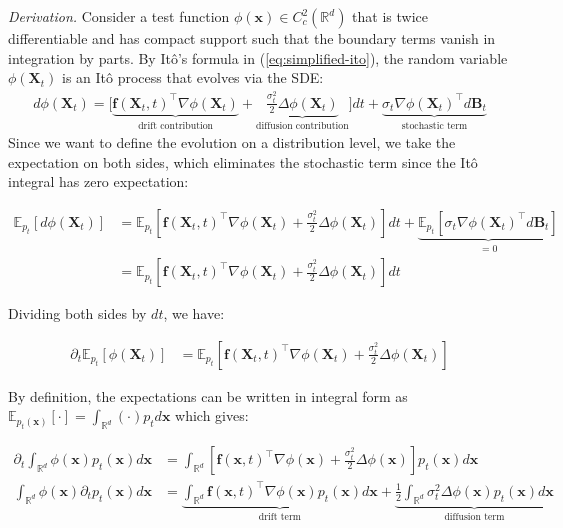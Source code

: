 \documentclass{article}
\begin{document}
\textit{Derivation.} Consider a test function $\phi(\boldsymbol{x})\in C_c^2(\mathbb{R}^d)$ that is twice differentiable and has compact support such that the boundary terms vanish in integration by parts. By Itô's formula in (\ref{eq:simplified-ito}), the random variable $\phi(\boldsymbol{X}_t)$ is an Itô process that evolves via the SDE:
\begin{align}
    d\phi(\boldsymbol{X}_t)=\bigg[\underbrace{\boldsymbol{f}(\boldsymbol{X}_t,t)^\top \nabla \phi(\boldsymbol{X}_t)}_{\text{drift contribution}}+\underbrace{\frac{\sigma_t^2}{2}\Delta \phi(\boldsymbol{X}_t)}_{\text{diffusion contribution}}\bigg]dt+\underbrace{\sigma_t\nabla \phi(\boldsymbol{X}_t)^\top d\boldsymbol{B}_t}_{\text{stochastic term}}
\end{align}
Since we want to define the evolution on a distribution level, we take the expectation on both sides, which eliminates the stochastic term since the Itô integral has zero expectation:
\begin{small}
\begin{align}
    \mathbb{E}_{p_t}\left[d\phi(\boldsymbol{X}_t)\right]&=\mathbb{E}_{p_t}\left[\boldsymbol{f}(\boldsymbol{X}_t,t)^\top \nabla \phi(\boldsymbol{X}_t)+\frac{\sigma_t^2}{2}\Delta \phi(\boldsymbol{X}_t)\right]dt+\underbrace{\mathbb{E}_{p_t}\left[\sigma_t\nabla \phi(\boldsymbol{X}_t)^\top d\boldsymbol{B}_t\right]}_{=0}\nonumber\\
    &=\mathbb{E}_{p_t}\left[\boldsymbol{f}(\boldsymbol{X}_t,t)^\top \nabla \phi(\boldsymbol{X}_t)+\frac{\sigma_t^2}{2}\Delta \phi(\boldsymbol{X}_t)\right]dt
\end{align}
\end{small}
Dividing both sides by $dt$, we have:
\begin{small}
\begin{align}
    \partial_t\mathbb{E}_{p_t}\left[\phi(\boldsymbol{X}_t)\right]&=\mathbb{E}_{p_t}\left[\boldsymbol{f}(\boldsymbol{X}_t,t)^\top\nabla \phi(\boldsymbol{X}_t)+\frac{\sigma_t^2}{2}\Delta \phi(\boldsymbol{X}_t)\right]
\end{align}
\end{small}
By definition, the expectations can be written in integral form as $\mathbb{E}_{p_t(\boldsymbol{x})}[\cdot]=\int_{\mathbb{R}^d}(\cdot)p_td\boldsymbol{x}$ which gives:
\begin{small}
\begin{align}
    \partial_t\int_{\mathbb{R}^d}\phi(\boldsymbol{x})p_t(\boldsymbol{x})d\boldsymbol{x}&=\int_{\mathbb{R}^d}\left[\boldsymbol{f}(\boldsymbol{x},t)^\top\nabla \phi(\boldsymbol{x})+\frac{\sigma_t^2}{2}\Delta \phi(\boldsymbol{x})\right]p_t(\boldsymbol{x})d\boldsymbol{x}\\
    \int_{\mathbb{R}^d}\phi(\boldsymbol{x})\partial_tp_t(\boldsymbol{x})d\boldsymbol{x}&=\underbrace{\int_{\mathbb{R}^d}\boldsymbol{f}(\boldsymbol{x},t)^\top  \nabla \phi(\boldsymbol{x})p_t(\boldsymbol{x})d\boldsymbol{x}}_{\text{drift term}}+\underbrace{\frac{1}{2}\int_{\mathbb{R}^d}\sigma_t^2\Delta\phi(\boldsymbol{x})p_t(\boldsymbol{x})d\boldsymbol{x}}_{\text{diffusion term}}\label{eq:fp-intermediate}
\end{align}
\end{small}
\end{document}
